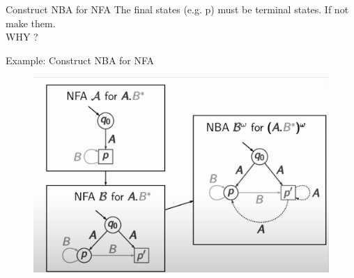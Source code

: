 \documentclass[14pts]{beamer}
\begin{document}
    \begin{frame}{Construct NBA for NFA}
      The final states (e.g. p) must be terminal states. If not make them.\\
      \alert{WHY ?}
    \end{frame}
    \begin{frame}{Example: Construct NBA for NFA}
      \begin{figure}
        \centering
        \includegraphics[width=1\textwidth]{photo4.jpeg}
      \end{figure}
    \end{frame}
\end{document}
